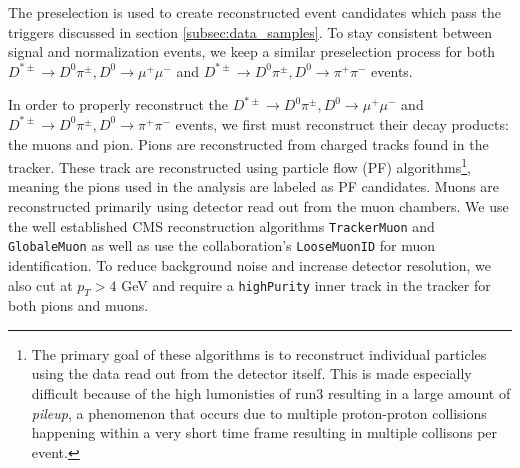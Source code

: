 The preselection is used to create reconstructed event candidates which pass the triggers discussed in section \ref{subsec:data_samples}. To stay consistent between signal and normalization events, we keep a similar preselection process for both $D^{*\pm} \to D^0 \pi^\pm, D^0 \to \mu^+ \mu^-$ and $D^{*\pm} \to D^0 \pi^\pm, D^0 \to \pi^+ \pi^-$ events.

In order to properly reconstruct the $D^{*\pm} \to D^0 \pi^\pm, D^0 \to \mu^+ \mu^-$ and $D^{*\pm} \to D^0 \pi^\pm, D^0 \to \pi^+ \pi^-$ events, we first must reconstruct their decay products: the muons and pion. Pions are reconstructed from charged tracks found in the tracker. These track are reconstructed using particle flow (PF) algorithms\footnote{The primary goal of these algorithms is to reconstruct individual particles using the data read out from the detector itself. This is made especially difficult because of the high lumonisties of run3 resulting in a large amount of \textit{pileup}, a phenomenon that occurs due to multiple proton-proton collisions happening within a very short time frame resulting in multiple collisons per event. }, meaning the pions used in the analysis are labeled as PF candidates. Muons are reconstructed primarily using detector read out from the muon chambers. We use the well established CMS reconstruction algorithms \texttt{TrackerMuon} and \texttt{GlobaleMuon} as well as use the collaboration's \texttt{LooseMuonID} for muon identification. To reduce background noise and increase detector resolution, we also cut at $p_T>4$ GeV and require a \texttt{highPurity} inner track in the tracker for both pions and muons.

